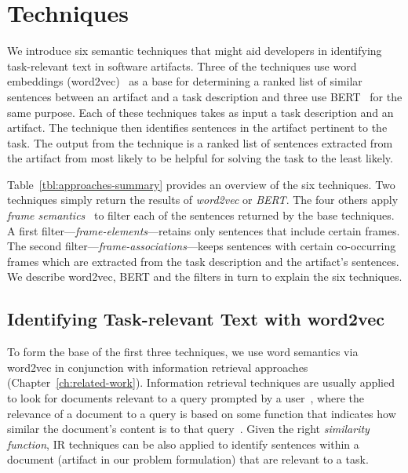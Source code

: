 
\section{Techniques}
\label{cp5:approaches}



We introduce six semantic techniques that might 
aid developers in identifying
task-relevant text in software artifacts. Three of the
techniques use word embeddings (word2vec)~\cite{Mikolov2013} as a base for determining a ranked list of similar sentences between an artifact
and a task description and three use BERT~\cite{Devlin2018Bert} for the same purpose.
Each of these techniques takes as input
a task description and an artifact. The technique then identifies
sentences in the artifact pertinent to the task. The output
from the technique is a ranked list of sentences extracted from
the artifact from most likely to be helpful for solving the
task to the least likely.



Table~\ref{tbl:approaches-summary} provides an overview of the six techniques.
Two techniques simply return the results of \textit{word2vec} or \textit{BERT}.
The four others apply \textit{frame semantics}~\cite{fillmore1976frame} to filter
 each of the sentences returned by the base techniques.
A first filter---\textit{frame-elements}---retains only sentences
that include certain frames. The second filter---\textit{frame-associations}---keeps
sentences with certain co-occurring 
frames which are extracted from the task description 
and the artifact's sentences. We describe word2vec, BERT and the filters in turn to
explain the six techniques.






\subsection{Identifying Task-relevant Text with word2vec}
\label{cp5:approach-w2v}



To form the base of the first three techniques,  we use word semantics via word2vec in conjunction with information retrieval approaches (Chapter~\ref{ch:related-work}).
Information retrieval techniques are usually applied to look for documents relevant to a query prompted by a user~\cite{Bavota2016}, where the relevance of a document to a query is based on some function that indicates how similar the document's content is to that query~\cite{Manning2009IR}. Given the right \textit{similarity function}, \acs{IR}  techniques 
can be also applied to identify sentences within a document (artifact in our problem formulation) that are relevant to a task.



